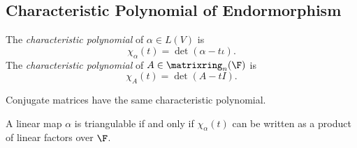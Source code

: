 \documentclass[a4paper]{article}
\newcommand*{\M}{\matrixring}
\theoremstyle{definition}
\begin{document}
\subsection{Characteristic Polynomial of Endormorphism}

\begin{definition}
   The \emph{characteristic polynomial} of \(\alpha \in L(V)\) is
  \[
    \chi_\alpha(t) = \det (\alpha - t \iota).
  \]
  The \emph{characteristic polynomial} of \(A \in \M_n(\F)\) is
  \[
    \chi_A(t) = \det (A - t I).
  \]
\end{definition}

Conjugate matrices have the same characteristic polynomial.

\begin{theorem}
  A linear map \(\alpha\) is triangulable if and only if \(\chi_\alpha(t)\) can be written as a product of linear factors over \(\F\).
\end{theorem}
\end{document}
